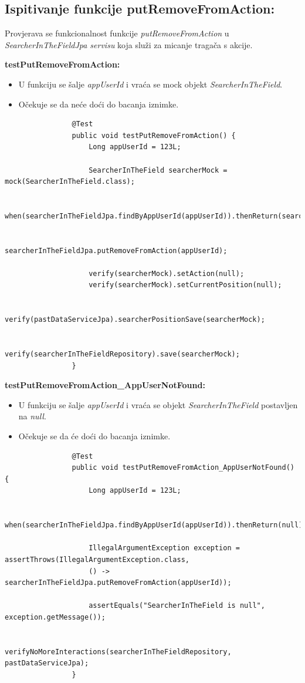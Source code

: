 			\subsection{Ispitivanje funkcije putRemoveFromAction:}
			Provjerava se funkcionalnost funkcije \textit{putRemoveFromAction} u \textit{SearcherInTheFieldJpa servisu} koja služi za micanje tragača s akcije.
			
			\textbf{testPutRemoveFromAction:}
			\begin{itemize}
				\item U funkciju se šalje \textit{appUserId} i vraća se mock objekt \textit{SearcherInTheField}.
				\item Očekuje se da neće doći do bacanja iznimke.
			\end{itemize}
			\begin{lstlisting}
				@Test
				public void testPutRemoveFromAction() {
					Long appUserId = 123L;
					
					SearcherInTheField searcherMock = mock(SearcherInTheField.class);
					
					when(searcherInTheFieldJpa.findByAppUserId(appUserId)).thenReturn(searcherMock);
					
					searcherInTheFieldJpa.putRemoveFromAction(appUserId);
					
					verify(searcherMock).setAction(null);
					verify(searcherMock).setCurrentPosition(null);
					
					verify(pastDataServiceJpa).searcherPositionSave(searcherMock);
					
					verify(searcherInTheFieldRepository).save(searcherMock);
				}
			\end{lstlisting}
			
			\textbf{testPutRemoveFromAction\_AppUserNotFound:}
			\begin{itemize}
				\item U funkciju se šalje \textit{appUserId} i vraća se objekt \textit{SearcherInTheField} postavljen na \textit{null}.
				\item Očekuje se da će doći do bacanja iznimke.
			\end{itemize}
			\begin{lstlisting}
				@Test
				public void testPutRemoveFromAction_AppUserNotFound() {
					Long appUserId = 123L;
					
					when(searcherInTheFieldJpa.findByAppUserId(appUserId)).thenReturn(null);
					
					IllegalArgumentException exception = assertThrows(IllegalArgumentException.class,
					() -> searcherInTheFieldJpa.putRemoveFromAction(appUserId));
					
					assertEquals("SearcherInTheField is null", exception.getMessage());
					
					verifyNoMoreInteractions(searcherInTheFieldRepository, pastDataServiceJpa);
				}
			\end{lstlisting}
			
